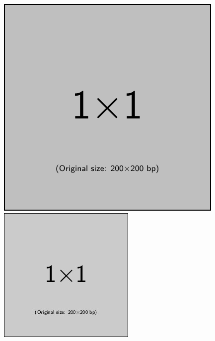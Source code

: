 \documentclass[10pt,conference,a4paper,nofonttune]{IEEEtran}
\begin{document}
\begin{figure}[t]
   \centering
   \begin{minipage}{.45\hsize}
      \centering
      \includegraphics[width=.8\hsize]{figure/example-image-1x1.pdf} %
   \end{minipage}
   \begin{minipage}{.45\hsize} 
      \centering
      \includegraphics[width=.8\hsize]{figure/example-image-1x1.jpg} %

\end{minipage}
\end{figure}
\end{document}
